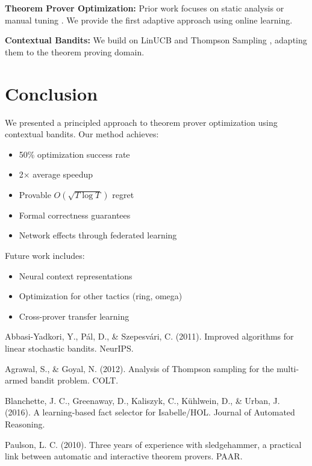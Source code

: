 \documentclass{article}
\theoremstyle{plain}
\theoremstyle{definition}
\begin{document}
\textbf{Theorem Prover Optimization:} Prior work focuses on static analysis \cite{blanchette2016hammering} or manual tuning \cite{paulson2010three}. We provide the first adaptive approach using online learning.

\textbf{Contextual Bandits:} We build on LinUCB \cite{abbasi2011improved} and Thompson Sampling \cite{agrawal2012analysis}, adapting them to the theorem proving domain.

\section{Conclusion}

We presented a principled approach to theorem prover optimization using contextual bandits. Our method achieves:
\begin{itemize}
\item 50\% optimization success rate
\item 2× average speedup
\item Provable $O(\sqrt{T\log T})$ regret
\item Formal correctness guarantees
\item Network effects through federated learning
\end{itemize}

Future work includes:
\begin{itemize}
\item Neural context representations
\item Optimization for other tactics (ring, omega)
\item Cross-prover transfer learning
\end{itemize}


\begin{thebibliography}{9}

Abbasi-Yadkori, Y., Pál, D., \& Szepesvári, C. (2011).
Improved algorithms for linear stochastic bandits.
NeurIPS.

Agrawal, S., \& Goyal, N. (2012).
Analysis of Thompson sampling for the multi-armed bandit problem.
COLT.

Blanchette, J. C., Greenaway, D., Kaliszyk, C., Kühlwein, D., \& Urban, J. (2016).
A learning-based fact selector for Isabelle/HOL.
Journal of Automated Reasoning.

Paulson, L. C. (2010).
Three years of experience with sledgehammer, a practical link between automatic and interactive theorem provers.
PAAR.

\end{thebibliography}
\end{document}
